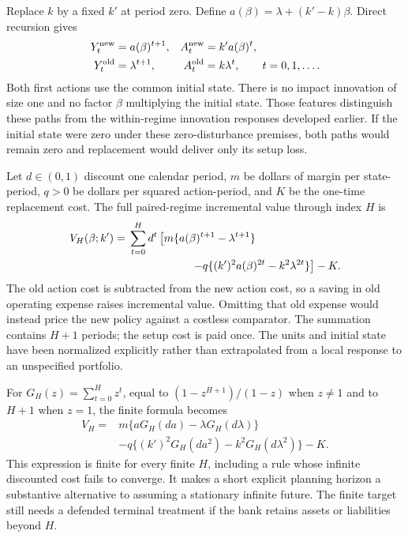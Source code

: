 Replace $k$ by a fixed $k'$ at period zero. Define
$a(\beta)=\lambda+(k'-k)\beta$. Direct recursion gives
\begin{align}
 Y_t^{\rm new}&=a(\beta)^{t+1},&
 A_t^{\rm new}&=k'a(\beta)^t,\nonumber\\
 Y_t^{\rm old}&=\lambda^{t+1},&
 A_t^{\rm old}&=k\lambda^t,\qquad t=0,1,\ldots.
 \label{exec17:s6-full-paths}
\end{align}
Both first actions use the common initial state. There is no impact
innovation of size one and no factor $\beta$ multiplying the initial
state. Those features distinguish these paths from the within-regime
innovation responses developed earlier. If the initial state were zero
under these zero-disturbance premises, both paths would remain zero and
replacement would deliver only its setup loss.

Let $d\in(0,1)$ discount one calendar period, $m$ be dollars of margin per
state-period, $q>0$ be dollars per squared action-period, and $K$ be the
one-time replacement cost. The full paired-regime incremental value through
index $H$ is
\begin{equation}
 \begin{split}
 V_H(\beta;k')={}&\sum_{t=0}^H d^t
 \left[m\{a(\beta)^{t+1}-\lambda^{t+1}\}\right.\\
 &\left.\hspace{20mm}-q\{(k')^2a(\beta)^{2t}-k^2\lambda^{2t}\}\right]-K.
 \end{split}
 \label{exec17:s6-full-finite}
\end{equation}
The old action cost is subtracted from the new action cost, so a saving in
old operating expense raises incremental value. Omitting that old expense
would instead price the new policy against a costless comparator. The
summation contains $H+1$ periods; the setup cost is paid once. The units and
initial state have been normalized explicitly rather than extrapolated
from a local response to an unspecified portfolio.

For $G_H(z)=\sum_{t=0}^Hz^t$, equal to $(1-z^{H+1})/(1-z)$ when
$z\ne1$ and to $H+1$ when $z=1$, the finite formula becomes
\begin{equation}
 \begin{split}
 V_H={}&m\{aG_H(da)-\lambda G_H(d\lambda)\}\\
       &-q\{(k')^2G_H(da^2)-k^2G_H(d\lambda^2)\}-K.
 \end{split}
 \label{exec17:s6-full-geometric}
\end{equation}
This expression is finite for every finite $H$, including a rule whose
infinite discounted cost fails to converge. It makes a short explicit
planning horizon a substantive alternative to assuming a stationary
infinite future. The finite target still needs a defended terminal
treatment if the bank retains assets or liabilities beyond $H$.

